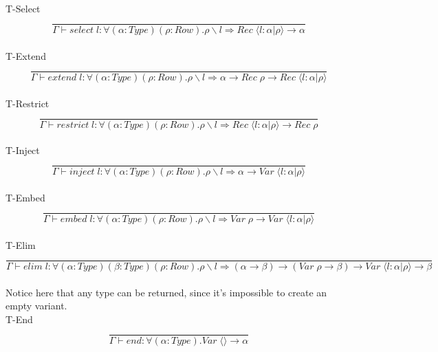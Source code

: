 \documentclass[12pt]{article}
\newcommand\llabel[0]{l}
\newcommand\tapp[2]{#1 \; #2} %
\newcommand\tarr[2]{#1 \rightarrow #2} %
\newcommand\tforalls[2]{\forall#1 . #2} %
\newcommand\tempty[0]{\langle\rangle} %
\newcommand\textend[3]{\langle#1:#2|#3\rangle} %
\newcommand\ttype[0]{\textit{Type}} %
\newcommand\trow[0]{\textit{Row}} %
\newcommand\tvariant[0]{\textit{Var}} %
\newcommand\trecord[0]{\textit{Rec}} %
\newcommand\clacks[2]{#1\backslash#2} %
\newcommand\timplies[2]{#1 \Rightarrow #2} %
\newcommand\eselect[1]{\textit{select} \; #1} %
\newcommand\eextend[1]{\textit{extend} \; #1} %
\newcommand\erestrict[1]{\textit{restrict} \; #1} %
\newcommand\einject[1]{\textit{inject} \; #1} %
\newcommand\eembed[1]{\textit{embed} \; #1} %
\newcommand\eelim[1]{\textit{elim} \; #1} %
\newcommand\eend[0]{\textit{end}} %
\begin{document}
T-Select \[\frac{
	\begin{array}{l}
	\end{array}
}{
	\Gamma \vdash \eselect{\llabel} : \tforalls{(\alpha:\ttype)(\rho:\trow)}{\timplies{\clacks{\rho}{\llabel}}{\tarr{\tapp{\trecord}{\textend{\llabel}{\alpha}{\rho}}}{\alpha}}}
}\]\\
T-Extend \[\frac{
	\begin{array}{l}
	\end{array}
}{
	\Gamma \vdash \eextend{\llabel} : \tforalls{(\alpha:\ttype)(\rho:\trow)}{\timplies{\clacks{\rho}{\llabel}}{\tarr{\alpha}{\tarr{\tapp{\trecord}{\rho}}{\tapp{\trecord}{\textend{\llabel}{\alpha}{\rho}}}}}}
}\]\\
T-Restrict \[\frac{
	\begin{array}{l}
	\end{array}
}{
	\Gamma \vdash \erestrict{\llabel} : \tforalls{(\alpha:\ttype)(\rho:\trow)}{\timplies{\clacks{\rho}{\llabel}}{\tarr{\tapp{\trecord}{\textend{\llabel}{\alpha}{\rho}}}{\tapp{\trecord}{\rho}}}}
}\]\\
T-Inject \[\frac{
	\begin{array}{l}
	\end{array}
}{
	\Gamma \vdash \einject{\llabel} : \tforalls{(\alpha:\ttype)(\rho:\trow)}{\timplies{\clacks{\rho}{\llabel}}{\tarr{\alpha}{\tapp{\tvariant}{\textend{\llabel}{\alpha}{\rho}}}}}
}\]\\
T-Embed \[\frac{
	\begin{array}{l}
	\end{array}
}{
	\Gamma \vdash \eembed{\llabel} : \tforalls{(\alpha:\ttype)(\rho:\trow)}{\timplies{\clacks{\rho}{\llabel}}{\tarr{\tapp{\tvariant}{\rho}}{\tapp{\tvariant}{\textend{\llabel}{\alpha}{\rho}}}}}
}\]\\
T-Elim \[\frac{
	\begin{array}{l}
	\end{array}
}{
	\Gamma \vdash \eelim{\llabel} : \tforalls{(\alpha:\ttype)(\beta:\ttype)(\rho:\trow)}{\timplies{\clacks{\rho}{\llabel}}{\tarr{(\tarr{\alpha}{\beta})}{(\tarr{\tarr{\tapp{\tvariant}{\rho}}{\beta})}{\tarr{\tapp{\tvariant}{\textend{\llabel}{\alpha}{\rho}}}{\beta}}}}}
}\]\\
Notice here that any type can be returned, since it's impossible to create an empty variant.\\
T-End \[\frac{
	\begin{array}{l}
	\end{array}
}{
	\Gamma \vdash \eend : \tforalls{(\alpha:\ttype)}{\tarr{\tapp{\tvariant}{\tempty}}{\alpha}}
}\]\\
\end{document}
